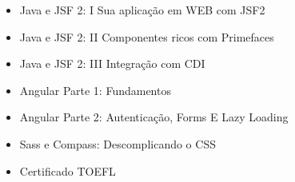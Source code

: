 \smallskip
\begin{itemize}
\item Java e JSF 2: I Sua aplicação em WEB com JSF2
\smallskip
\item  Java e JSF 2: II Componentes ricos com Primefaces
\smallskip
\item  Java e JSF 2: III Integração com CDI
\smallskip
\item Angular Parte 1: Fundamentos
\smallskip 
\item Angular Parte 2: Autenticação, Forms E Lazy Loading
\smallskip 
\item Sass e Compass: Descomplicando o CSS
\smallskip
\item Certificado TOEFL
\smallskip


\end{itemize}
\bigskip

\begin{comment}

\bigskip

\cvsection{Atividades \newline \smallskip Complementares}
\cvproject{Projeto de Tutoria entre Pares}
\begin{itemize}
\item Projeto de tutoria que tem como função dar apoio, acompanhamento e orientação à estudantes recém chegados à universidade.
\end{itemize}
\smallskip
\cvproject{Hacktoberfest}
\begin{itemize}
\item Evento que busca incentivar a contribuição em projetos open source. Realizado pela Digital Ocean com parceira com o GitHub.
\end{itemize}
\smallskip
\cvproject{2ª MAPCOM}
\begin{itemize}
\item 2ª Maratona de Programação de Computadores realizada no polo CEUNES da Universidade Federal do Espírito Santo.
\end{itemize}
\smallskip
\cvproject{Diretoria do Evento IV ENCOMP}
\begin{itemize}
\item Uma das diretoras e organizadoras do evento regional IV ENCOMP (Encontro Norte Capixaba de Computação) no polo CEUNES da Universidade Federal do Espírito Santo.
\end{itemize}
\smallskip

\end{comment}

\cvproject{}
